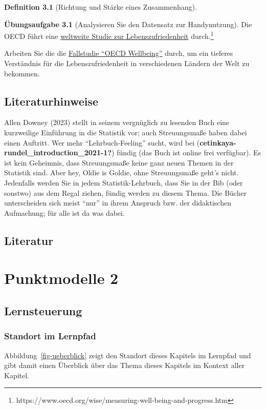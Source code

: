 \documentclass[
  a4paper,
  DIV=11]{scrreprt}
\theoremstyle{definition}
\newtheorem{exercise}{Übungsaufgabe}[chapter]
\theoremstyle{definition}
\theoremstyle{definition}
\newtheorem{definition}{Definition}[chapter]
\theoremstyle{remark}
\begin{document}
\begin{definition}[Richtung und Stärke eines
Zusammenhang]
\begin{exercise}[Analysieren Sie den Datensatz zur
Handynutzung]
Die OECD führt eine
\href{https://www.oecd.org/wise/measuring-well-being-and-progress.htm}{weltweite
Studie zur Lebenszufriedenheit} durch.\footnote{https://www.oecd.org/wise/measuring-well-being-and-progress.htm}

Arbeiten Sie die die
\href{https://datenwerk.netlify.app/posts/oecd-yacsda/}{Fallstudie
``OECD Wellbeing''} durch, um ein tieferes Verständnis für die
Lebenszufriedenheit in verschiedenen Ländern der Welt zu bekommen.

\section{Literaturhinweise}\label{literaturhinweise-5}

Allen Downey (2023) stellt in seinem vergnüglich zu lesenden Buch eine
kurzweilige Einführung in die Statistik vor; auch Streuungsmaße haben
dabei einen Auftritt. Wer mehr ``Lehrbuch-Feeling'' sucht, wird bei
(\textbf{cetinkaya-rundel\_introduction\_2021-1?}) fündig (das Buch ist
online frei verfügbar). Es ist kein Geheimnis, dass Streuungsmaße keine
ganz neuen Themen in der Statistik sind. Aber hey, Oldie is Goldie, ohne
Streuungsmaße geht's nicht. Jedenfalls werden Sie in jedem
Statistik-Lehrbuch, dass Sie in der Bib (oder sonstwo) aus dem Regal
ziehen, fündig werden zu diesem Thema. Die Bücher unterscheiden sich
meist ``nur'' in ihrem Anspruch bzw. der didaktischen Aufmachung; für
alle ist da was dabei.

\section{Literatur}\label{literatur-5}

\chapter{Punktmodelle 2}\label{sec-zusammenhaenge}

\section{Lernsteuerung}\label{lernsteuerung-6}

\subsection{Standort im Lernpfad}\label{standort-im-lernpfad-6}

Abbildung~\ref{fig-ueberblick} zeigt den Standort dieses Kapitels im
Lernpfad und gibt damit einen Überblick über das Thema dieses Kapitels
im Kontext aller Kapitel.


\end{exercise}
\end{definition}
\end{document}
